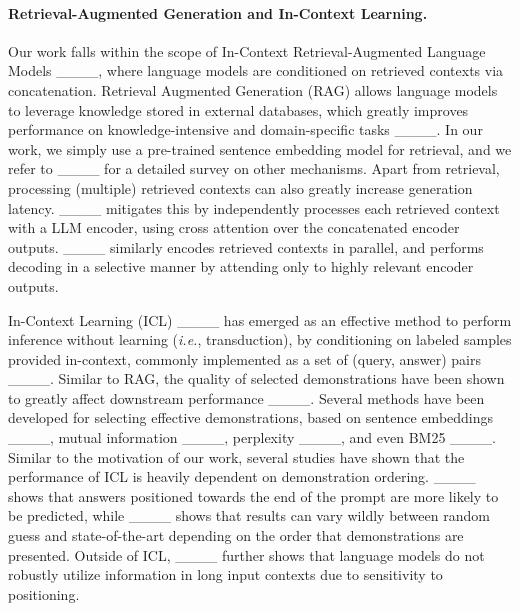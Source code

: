 \paragraph{Retrieval-Augmented Generation and In-Context Learning.}
Our work falls within the scope of In-Context Retrieval-Augmented Language Models ____, where language models are conditioned on retrieved contexts via concatenation. Retrieval Augmented Generation (RAG) allows language models to leverage knowledge stored in external databases, which greatly improves performance on knowledge-intensive and domain-specific tasks ____. In our work, we simply use a pre-trained sentence embedding model for retrieval, and we refer to ____ for a detailed survey on other mechanisms.
Apart from retrieval, processing (multiple) retrieved contexts can also greatly increase generation latency. ____ mitigates this by independently processes each retrieved context with a LLM encoder, using cross attention over the concatenated encoder outputs. ____ similarly encodes retrieved contexts in parallel, and performs decoding in a selective manner by attending only to highly relevant encoder outputs.

In-Context Learning (ICL) ____ has emerged as an effective method to perform inference without learning (\textit{i.e.}, transduction), by conditioning on labeled samples provided in-context, commonly implemented as a set of (query, answer) pairs ____. 
Similar to RAG, the quality of selected demonstrations have been shown to greatly affect downstream performance ____. Several methods have been developed for selecting effective demonstrations, based on sentence embeddings ____, mutual information ____, perplexity ____, and even BM25 ____.
Similar to the motivation of our work, several studies have shown that the performance of ICL is heavily dependent on demonstration ordering. ____ shows that answers positioned towards the end of the prompt are more likely to be predicted, while ____ shows that results can vary wildly between random guess and state-of-the-art depending on the order that demonstrations are presented. Outside of ICL, ____ further shows that language models do not robustly utilize information in long input contexts due to sensitivity to positioning.


